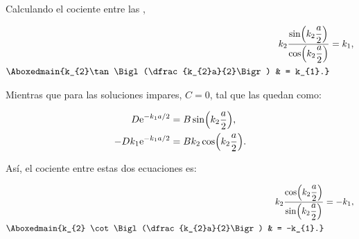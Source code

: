 \documentclass[../main.tex]{subfiles}
\begin{document}
\begin{problema}
	Calculando el cociente entre las ,

	\begin{align*}
		k_{2}\dfrac{\sin\Bigl(k_{2}\dfrac{a}{2}\Bigr)}{\cos\Bigl(k_{2}\dfrac{a}{2}\Bigr)} & = k_{1},  \\
		\Aboxedmain{k_{2}\tan\Bigl(\dfrac{k_{2}a}{2}\Bigr)                                & = k_{1}.}
	\end{align*}

	Mientras que para las soluciones impares, \(C = 0\),
	tal que las  quedan como:

	\begin{align*}
		D \mathrm{e}^{-k_{1}a/2}      & = B \sin\Bigl(k_{2}\dfrac{a}{2}\Bigr),     \\
		-Dk_{1}\mathrm{e}^{-k_{1}a/2} & = Bk_{2}\cos\Bigl(k_{2}\dfrac{a}{2}\Bigr).
	\end{align*}

	Así, el cociente entre estas dos ecuaciones es:

	\begin{align*}
		k_{2}\dfrac{\cos\Bigl(k_{2}\dfrac{a}{2}\Bigr)}{\sin\Bigl(k_{2}\dfrac{a}{2}\Bigr)} & = -k_{1},  \\
		\Aboxedmain{k_{2} \cot\Bigl(\dfrac{k_{2}a}{2}\Bigr)                               & = -k_{1}.}
	\end{align*}
\end{problema}
\end{document}
